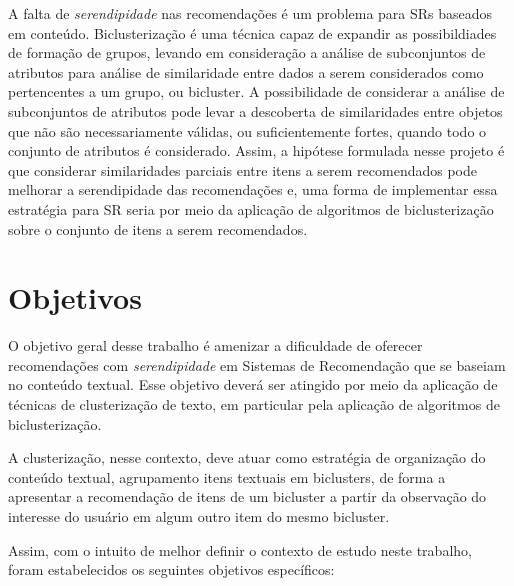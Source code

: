 \documentclass[normaltoc, espacoumemeio, pnumromarab,ruledheader]{abnt}
\begin{document}
A falta de \textit{serendipidade} nas recomendações é um problema para SRs baseados em conteúdo. Biclusterização é uma técnica capaz de expandir as possibildiades de formação de grupos, levando em consideração a análise de subconjuntos de atributos para análise de similaridade entre dados a serem considerados como pertencentes a um grupo, ou bicluster. A possibilidade de considerar a análise de subconjuntos de atributos pode levar a descoberta de similaridades entre objetos que não são necessariamente válidas, ou suficientemente fortes, quando todo o conjunto de atributos é considerado. Assim, a hipótese formulada nesse projeto é que considerar similaridades parciais entre itens a serem recomendados pode melhorar a serendipidade das recomendações e, uma forma de implementar essa estratégia para SR seria por meio da aplicação de algoritmos de biclusterização sobre o conjunto de itens a serem recomendados.


\section{Objetivos}


O objetivo geral desse trabalho é amenizar a dificuldade de oferecer recomendações com \textit{serendipidade} em Sistemas de Recomendação que se baseiam no conteúdo textual.
Esse objetivo deverá ser atingido por meio da aplicação de técnicas de clusterização de texto, em particular pela aplicação de algoritmos de biclusterização. 

A clusterização, nesse contexto, deve atuar como estratégia de organização do conteúdo textual, agrupamento itens textuais em biclusters, de forma a apresentar a recomendação de itens de um bicluster a partir da observação do interesse do usuário em algum outro item do mesmo bicluster.

Assim, com o intuito de melhor definir o contexto de estudo neste trabalho, foram estabelecidos os seguintes objetivos específicos:
\end{document}
